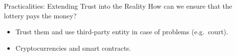 \begin{frame}{Practicalities: Extending Trust into the Reality}
    How can we ensure that the lottery pays the money?
    \begin{itemize}
        \item Trust them and use third-party entity in case of problems (e.g.\ court).
        \item Cryptocurrencies and smart contracts.
    \end{itemize}
\end{frame}
